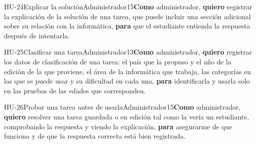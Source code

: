 \begin{historia}[1]{HU-24}{Explicar la solución}{Administrador}{1}{5}{\textbf{Como} administrador, \textbf{quiero} registrar la explicación de la solución de una tarea, que puede incluir una sección adicional sobre su relación con la informática, \textbf{para} que el estudiante entienda la respuesta después de intentarla.}
\end{historia}

\begin{historia}[1]{HU-25}{Clasificar una tarea}{Administrador}{1}{3}{\textbf{Como} administrador, \textbf{quiero} registrar los datos de clasificación de una tarea: el país que la propuso y el año de la edición de la que proviene, el área de la informática que trabaja, las categorías en las que se puede usar y su dificultad en cada una, \textbf{para} identificarla y usarla solo en las pruebas de las edades que corresponden.}
\end{historia}

\begin{historia}[1]{HU-26}{Probar una tarea antes de usarla}{Administrador}{1}{5}{\textbf{Como} administrador, \textbf{quiero} resolver una tarea guardada o en edición tal como la vería un estudiante, comprobando la respuesta y viendo la explicación, \textbf{para} asegurarme de que funciona y de que la respuesta correcta está bien registrada.}
\end{historia}

